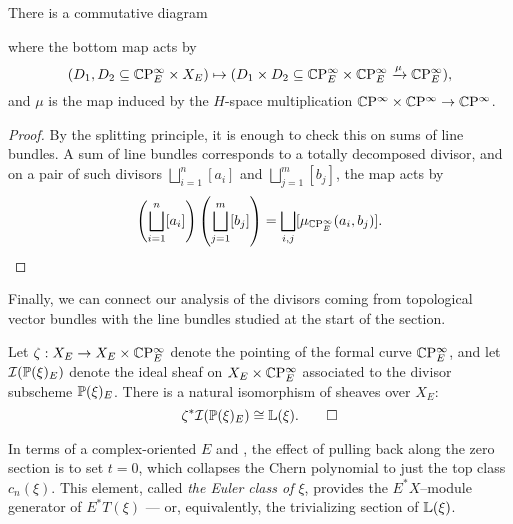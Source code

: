 \begin{corollary}
There is a commutative diagram
\begin{center}
\end{center}
where the bottom map acts by \[(D_1, D_2 \subseteq \CP^\infty_E \times X_E) \mapsto (D_1 \times D_2 \subseteq \CP^\infty_E \times \CP^\infty_E \xrightarrow{\mu} \CP^\infty_E),\] and $\mu$ is the map induced by the $H$-space multiplication $\CP^\infty \times \CP^\infty \to \CP^\infty$.
\end{corollary}
\begin{proof}
By the splitting principle, it is enough to check this on sums of line bundles.  A sum of line bundles corresponds to a totally decomposed divisor, and on a pair of such divisors $\bigsqcup_{i=1}^n [a_i]$ and $\bigsqcup_{j=1}^m [b_j]$, the map acts by \[\left(\bigsqcup_{i=1}^n [a_i] \right) \left( \bigsqcup_{j=1}^m [b_j] \right) = \bigsqcup_{i, j} [\mu_{\CP^\infty_E}(a_i, b_j)]. \qedhere\]
\end{proof}

Finally, we can connect our analysis of the divisors coming from topological vector bundles with the line bundles studied at the start of the section.
\begin{lemma}
Let $\zeta: X_E \to X_E \times \CP^\infty_E$ denote the pointing of the formal curve $\CP^\infty_E$, and let $\sheaf I(\P(\xi)_E)$ denote the ideal sheaf on $X_E \times \CP^\infty_E$ associated to the divisor subscheme $\P(\xi)_E$.  There is a natural isomorphism of sheaves over $X_E$: \[\zeta^* \sheaf I(\P(\xi)_E) \cong \ThomSheaf{\xi}. \qed\]
\end{lemma}

\begin{remark}
In terms of a complex-oriented $E$ and , the effect of pulling back along the zero section is to set $t = 0$, which collapses the Chern polynomial to just the top class $c_n(\xi)$.  This element, called \textit{the Euler class of $\xi$}, provides the $E^* X$--module generator of $E^* T(\xi)$ --- or, equivalently, the trivializing section of $\ThomSheaf{\xi}$.
\end{remark}

